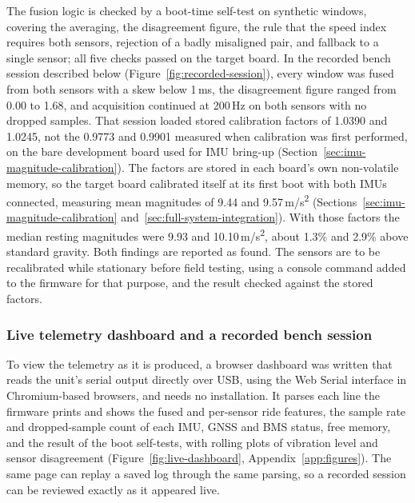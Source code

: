 The fusion logic is checked by a boot-time self-test on synthetic windows, covering the averaging, the disagreement figure, the rule that the speed index requires both sensors, rejection of a badly misaligned pair, and fallback to a single sensor; all five checks passed on the target board. In the recorded bench session described below (Figure~\ref{fig:recorded-session}), every window was fused from both sensors with a skew below 1\,ms, the disagreement figure ranged from 0.00 to 1.68, and acquisition continued at 200\,Hz on both sensors with no dropped samples. That session loaded stored calibration factors of 1.0390 and 1.0245, not the 0.9773 and 0.9901 measured when calibration was first performed, on the bare development board used for IMU bring-up (Section~\ref{sec:imu-magnitude-calibration}). The factors are stored in each board's own non-volatile memory, so the target board calibrated itself at its first boot with both IMUs connected, measuring mean magnitudes of 9.44 and 9.57\,m/s\textsuperscript{2} (Sections~\ref{sec:imu-magnitude-calibration} and~\ref{sec:full-system-integration}). With those factors the median resting magnitudes were 9.93 and 10.10\,m/s\textsuperscript{2}, about 1.3\% and 2.9\% above standard gravity. Both findings are reported as found. The sensors are to be recalibrated while stationary before field testing, using a console command added to the firmware for that purpose, and the result checked against the stored factors.

\subsubsection*{Live telemetry dashboard and a recorded bench session}

To view the telemetry as it is produced, a browser dashboard was written that reads the unit's serial output directly over USB, using the Web Serial interface in Chromium-based browsers, and needs no installation. It parses each line the firmware prints and shows the fused and per-sensor ride features, the sample rate and dropped-sample count of each IMU, GNSS and BMS status, free memory, and the result of the boot self-tests, with rolling plots of vibration level and sensor disagreement (Figure~\ref{fig:live-dashboard}, Appendix~\ref{app:figures}). The same page can replay a saved log through the same parsing, so a recorded session can be reviewed exactly as it appeared live.

